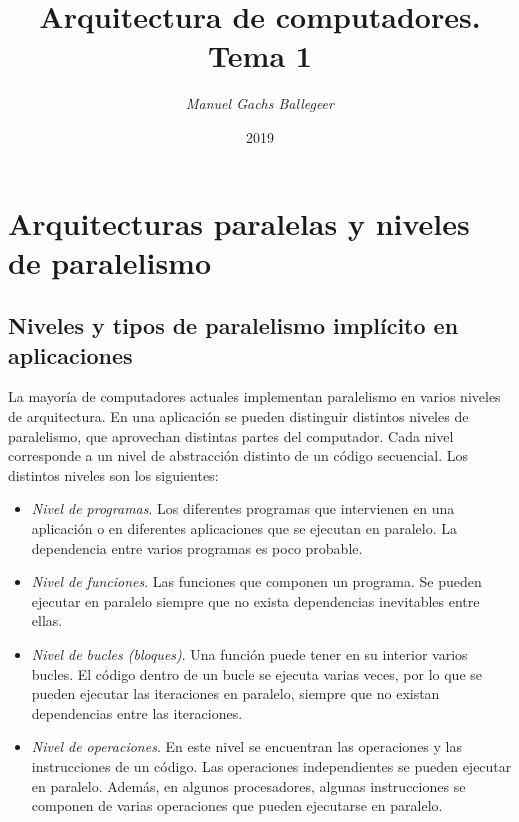 \documentclass[11pt,twoside,titlepage,a4paper]{article}
\begin{document}
\title{\Huge{\textbf{Arquitectura de computadores. Tema 1}}}
\author{\textit{Manuel Gachs Ballegeer}}
\date{2019}
\maketitle

\tableofcontents
\clearpage

\section{Arquitecturas paralelas y niveles de paralelismo}

\subsection{Niveles y tipos de paralelismo implícito en aplicaciones}
La mayoría de computadores actuales implementan paralelismo en varios niveles de arquitectura. En una
aplicación se pueden distinguir distintos niveles de paralelismo, que aprovechan distintas partes del
computador. Cada nivel corresponde a un nivel de abstracción distinto de un código secuencial. Los distintos
niveles son los siguientes:
\begin{itemize}[noitemsep]
	\item \textit{Nivel de programas}. Los diferentes programas que intervienen en una aplicación o en 
	diferentes aplicaciones que se ejecutan en paralelo. La dependencia entre varios programas es poco  
	probable.
	\item \textit{Nivel de funciones}. Las funciones que componen un programa. Se pueden ejecutar en
	paralelo siempre que no exista dependencias inevitables entre ellas.
	\item \textit{Nivel de bucles (bloques)}. Una función puede tener en su interior varios bucles. El
	código dentro de un bucle se ejecuta varias veces, por lo que se pueden ejecutar las iteraciones en 
	paralelo, siempre que no existan dependencias entre las iteraciones.
	\item \textit{Nivel de operaciones}. En este nivel se encuentran las operaciones y las instrucciones de
	un código. Las operaciones independientes se pueden ejecutar en paralelo. Además, en algunos 
	procesadores, algunas instrucciones se componen de varias operaciones que pueden ejecutarse en paralelo.
\end{itemize}
\end{document}
